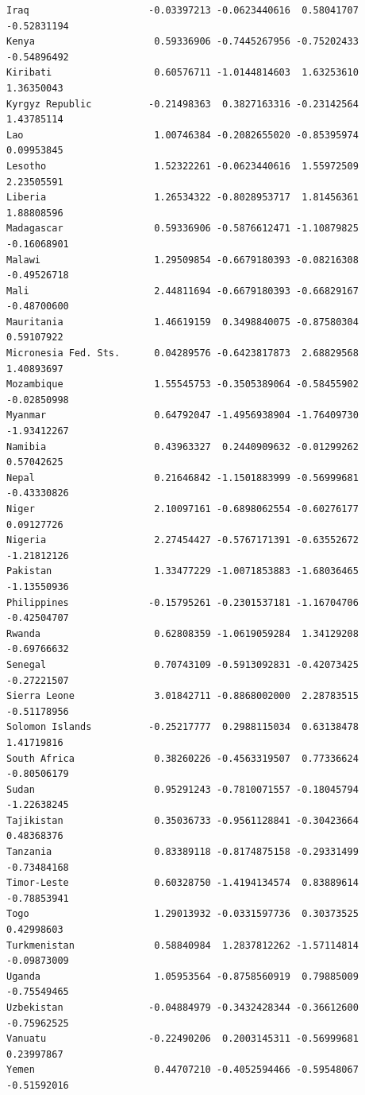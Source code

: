 \documentclass[
]{article}
\begin{document}
\begin{verbatim}
Iraq                     -0.03397213 -0.0623440616  0.58041707 -0.52831194
Kenya                     0.59336906 -0.7445267956 -0.75202433 -0.54896492
Kiribati                  0.60576711 -1.0144814603  1.63253610  1.36350043
Kyrgyz Republic          -0.21498363  0.3827163316 -0.23142564  1.43785114
Lao                       1.00746384 -0.2082655020 -0.85395974  0.09953845
Lesotho                   1.52322261 -0.0623440616  1.55972509  2.23505591
Liberia                   1.26534322 -0.8028953717  1.81456361  1.88808596
Madagascar                0.59336906 -0.5876612471 -1.10879825 -0.16068901
Malawi                    1.29509854 -0.6679180393 -0.08216308 -0.49526718
Mali                      2.44811694 -0.6679180393 -0.66829167 -0.48700600
Mauritania                1.46619159  0.3498840075 -0.87580304  0.59107922
Micronesia Fed. Sts.      0.04289576 -0.6423817873  2.68829568  1.40893697
Mozambique                1.55545753 -0.3505389064 -0.58455902 -0.02850998
Myanmar                   0.64792047 -1.4956938904 -1.76409730 -1.93412267
Namibia                   0.43963327  0.2440909632 -0.01299262  0.57042625
Nepal                     0.21646842 -1.1501883999 -0.56999681 -0.43330826
Niger                     2.10097161 -0.6898062554 -0.60276177  0.09127726
Nigeria                   2.27454427 -0.5767171391 -0.63552672 -1.21812126
Pakistan                  1.33477229 -1.0071853883 -1.68036465 -1.13550936
Philippines              -0.15795261 -0.2301537181 -1.16704706 -0.42504707
Rwanda                    0.62808359 -1.0619059284  1.34129208 -0.69766632
Senegal                   0.70743109 -0.5913092831 -0.42073425 -0.27221507
Sierra Leone              3.01842711 -0.8868002000  2.28783515 -0.51178956
Solomon Islands          -0.25217777  0.2988115034  0.63138478  1.41719816
South Africa              0.38260226 -0.4563319507  0.77336624 -0.80506179
Sudan                     0.95291243 -0.7810071557 -0.18045794 -1.22638245
Tajikistan                0.35036733 -0.9561128841 -0.30423664  0.48368376
Tanzania                  0.83389118 -0.8174875158 -0.29331499 -0.73484168
Timor-Leste               0.60328750 -1.4194134574  0.83889614 -0.78853941
Togo                      1.29013932 -0.0331597736  0.30373525  0.42998603
Turkmenistan              0.58840984  1.2837812262 -1.57114814 -0.09873009
Uganda                    1.05953564 -0.8758560919  0.79885009 -0.75549465
Uzbekistan               -0.04884979 -0.3432428344 -0.36612600 -0.75962525
Vanuatu                  -0.22490206  0.2003145311 -0.56999681  0.23997867
Yemen                     0.44707210 -0.4052594466 -0.59548067 -0.51592016

\end{verbatim}
\end{document}
